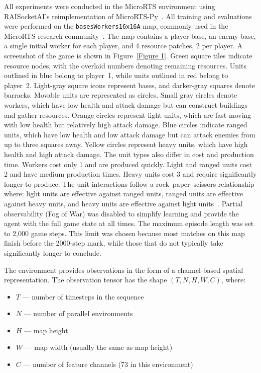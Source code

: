 \documentclass[10pt,twocolumn,letterpaper]{article}
\begin{document}
All experiments were conducted in the MicroRTS environment using RAISocketAI’s reimplementation of MicroRTS-Py~\cite{goodfriend2024raisocketai}. All training and evaluations were performed on the \texttt{basesWorkers16x16A} map, commonly used in the MicroRTS research community~\cite{huang2021gym,ontanon2018first}. The map contains a player base, an enemy base, a single initial worker for each player, and 4 resource patches, 2 per player. A screenshot of the game is shown in Figure~\ref{Figure 1}. Green square tiles indicate resource nodes, with the overlaid numbers denoting remaining resources. Units outlined in blue belong to player~1, while units outlined in red belong to player~2. Light-gray square icons represent bases, and darker-gray squares denote barracks. Movable units are represented as circles. Small gray circles denote workers, which have low health and attack damage but can construct buildings and gather resources. Orange circles represent light units, which are fast moving with low health but relatively high attack damage. Blue circles indicate ranged units, which have low health and low attack damage but can attack enemies from up to three squares away. Yellow circles represent heavy units, which have high health and high attack damage. The unit types also differ in cost and production time. Workers cost only 1 and are produced quickly. Light and ranged units cost 2 and have medium production times. Heavy units cost 3 and require significantly longer to produce. The unit interactions follow a rock–paper–scissors relationship where: light units are effective against ranged units, ranged units are effective against heavy units, and heavy units are effective against light units~\cite{richoux2020microphantom}.
Partial observability (Fog of War) was disabled to simplify learning and provide the agent with the full game state at all times. The maximum episode length was set to 2,000 game steps. This limit was chosen because most matches on this map finish before the 2000-step mark, while those that do not typically take significantly longer to conclude.

 The environment provides observations in the form of a channel-based spatial representation. The observation tensor has the shape \((T, N, H, W, C)\), where:
\begin{itemize}
    \item \(T\) — number of timesteps in the sequence
    \item \(N\) — number of parallel environments
    \item \(H\) — map height 
    \item \(W\) — map width (usually the same as map height)
    \item \(C\) — number of feature channels (73 in this environment)
\end{itemize}
\end{document}

